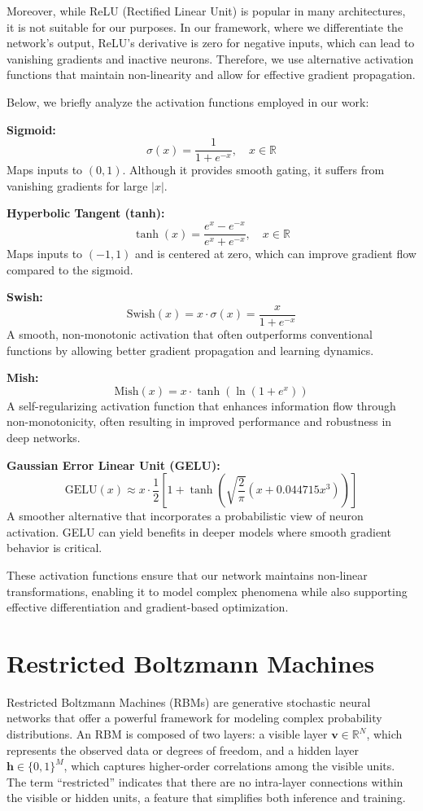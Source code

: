 Moreover, while ReLU (Rectified Linear Unit) is popular in many architectures, it is not suitable for our purposes. In our framework, where we differentiate the network's output, ReLU's derivative is zero for negative inputs, which can lead to vanishing gradients and inactive neurons. Therefore, we use alternative activation functions that maintain non-linearity and allow for effective gradient propagation.

Below, we briefly analyze the activation functions employed in our work:

\textbf{Sigmoid:}
\[
\sigma(x) = \frac{1}{1+e^{-x}}, \quad x \in \mathbb{R}
\]
Maps inputs to \((0,1)\). Although it provides smooth gating, it suffers from vanishing gradients for large \(|x|\).

\textbf{Hyperbolic Tangent (tanh):}
\[
\tanh(x) = \frac{e^x - e^{-x}}{e^x + e^{-x}}, \quad x \in \mathbb{R}
\]
Maps inputs to \((-1,1)\) and is centered at zero, which can improve gradient flow compared to the sigmoid.

\textbf{Swish:}
\[
\text{Swish}(x) = x \cdot \sigma(x) = \frac{x}{1+e^{-x}}
\]
A smooth, non-monotonic activation that often outperforms conventional functions by allowing better gradient propagation and learning dynamics.

\textbf{Mish:}
\[
\text{Mish}(x) = x \cdot \tanh\left(\ln(1+e^x)\right)
\]
A self-regularizing activation function that enhances information flow through non-monotonicity, often resulting in improved performance and robustness in deep networks.

\textbf{Gaussian Error Linear Unit (GELU):}
\[
\text{GELU}(x) \approx x \cdot \frac{1}{2}\left[1 + \tanh\left(\sqrt{\frac{2}{\pi}}(x + 0.044715x^3)\right)\right]
\]
A smoother alternative that incorporates a probabilistic view of neuron activation. GELU can yield benefits in deeper models where smooth gradient behavior is critical.

These activation functions ensure that our network maintains non-linear transformations, enabling it to model complex phenomena while also supporting effective differentiation and gradient-based optimization.


\section{Restricted Boltzmann Machines}

Restricted Boltzmann Machines (RBMs) are generative stochastic neural networks that offer a powerful framework for modeling complex probability distributions. An RBM is composed of two layers: a visible layer $\mathbf{v} \in \mathbb{R}^{N}$, which represents the observed data or degrees of freedom, and a hidden layer $\mathbf{h} \in \{0,1\}^{M}$, which captures higher-order correlations among the visible units. The term ``restricted'' indicates that there are no intra-layer connections within the visible or hidden units, a feature that simplifies both inference and training.

